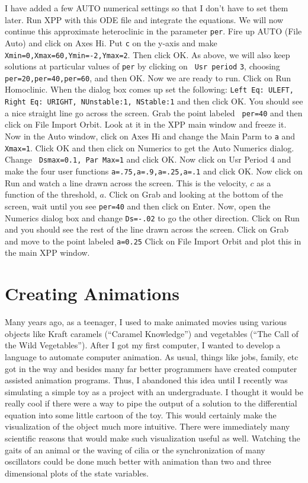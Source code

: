\documentclass{article}
\begin{document}
I have added a few AUTO numerical settings so that I don't have to set
them later.  Run XPP with this ODE file and integrate the
equations. We will now continue this approximate heteroclinic in the
parameter {\tt per}. Fire up AUTO (File Auto) and click on Axes
Hi. Put {\tt c} on the y-axis and make {\tt
Xmin=0,Xmax=60,Ymin=-2,Ymax=2}. Then click OK.  As above, we will also
keep solutions at particular values of {\tt per} by clicking on {\tt
Usr period} {\tt 3}, choosing {\tt per=20,per=40,per=60}, and then OK.
Now we are ready to run. Click on Run Homoclinic. When the dialog box
comes up set the following: {\tt Left Eq: ULEFT, Right Eq: URIGHT,
NUnstable:1, NStable:1}  and then click OK.   You should see a nice
straight line go across the screen. Grab the point labeled {\tt
per=40} and then click on File Import Orbit. Look at it in the XPP
main window and freeze it.  Now in the Auto window, click on Axes Hi
and change the Main Parm to {\tt a} and {\tt Xmax=1}.  Click OK and
then click on Numerics to get the Auto Numerics dialog. Change {\tt
Dsmax=0.1, Par Max=1} and click OK. Now click on Usr Period 4 and make
the four user functions {\tt a=.75,a=.9,a=.25,a=.1} and click OK.  Now
click on Run and watch a line drawn across the screen. This is the
velocity, $c$ as a function of the threshold, $a$. Click on Grab and
looking at the bottom of the screen, wait until you see {\tt per=40}
and then click on Enter.  Now, open the Numerics dialog box and change
{\tt Ds=-.02} to go the other direction.  Click on Run and you should
see the rest of the line drawn across the screen. Click on Grab and
move to the point labeled {\tt a=0.25}  Click on File Import Orbit and
plot this in the main XPP window. 


\section{Creating Animations}
\label{toon}
Many years ago, as a teenager, I used to make animated movies using
various objects like Kraft caramels (``Caramel Knowledge'') and
vegetables (``The Call of the Wild Vegetables'').  After I got my
first computer, I wanted to develop a language to automate computer
animation. As usual, things like jobs, family, etc got in the way and
besides many far better programmers have created computer assisted
animation programs.  Thus, I abandoned this idea until I recently was
simulating a simple toy as a project with an undergraduate.  I thought
it would be really cool if there were a way to pipe the output of a
solution to the differential equation into some little cartoon of the
toy. This would certainly make the visualization of the object much
more intuitive. There were immediately many scientific reasons that
would make such visualization useful as well. Watching the gaits of an
animal or the waving of cilia or the synchronization of many
oscillators could be done much better with animation
than two and three dimensional plots of the state variables. 
 
\end{document}
